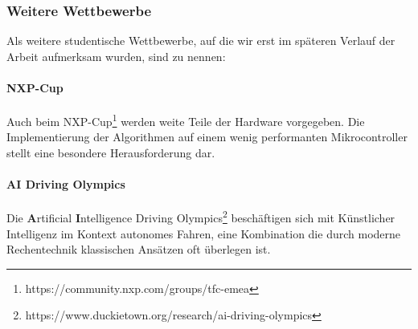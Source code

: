 \subsubsection{Weitere Wettbewerbe}
Als weitere studentische Wettbewerbe, auf die wir erst im späteren Verlauf der Arbeit aufmerksam wurden, sind zu nennen:
\paragraph{NXP-Cup}
Auch beim NXP-Cup\footnote{https://community.nxp.com/groups/tfc-emea} werden weite Teile der Hardware vorgegeben. Die Implementierung der Algorithmen auf einem wenig performanten Mikrocontroller stellt eine besondere Herausforderung dar. 
\paragraph{AI Driving Olympics}
Die \textbf{A}rtificial \textbf{I}ntelligence Driving Olympics\footnote{https://www.duckietown.org/research/ai-driving-olympics} beschäftigen sich mit Künstlicher Intelligenz im Kontext autonomes Fahren, eine Kombination die durch moderne Rechentechnik klassischen Ansätzen oft überlegen ist. 
